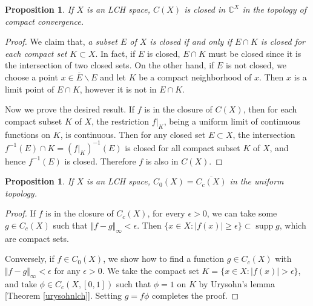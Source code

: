 \documentclass{article}
\numberwithin{equation}{section}
\newcommand{\bbC}{\mathbb{C}}
\newcommand{\ol}{\overline}
\DeclareMathOperator{\supp}{supp}
\theoremstyle{plain}
\newtheorem{proposition}[theorem]{Proposition}
\theoremstyle{definition}
\begin{document}
\begin{proposition}
	If $X$ is an LCH space, $C(X)$ is closed in $\bbC^X$ in the topology of compact convergence. 
\end{proposition}
\begin{proof}
	We claim that, \textit{a subset $E$ of $X$ is closed if and only if $E\cap K$ is closed for each compact set $K\subset X$}. In fact, if $E$ is closed, $E\cap K$ must be closed since it is the intersection of two closed sets. On the other hand, if $E$ is not closed, we choose a point $x\in\ol{E}\backslash E$ and let $K$ be a compact neighborhood of $x$. Then $x$ is a limit point of $E\cap K$, however it is not in $E\cap K$.
	
	Now we prove the desired result. If $f$ is in the closure of $C(X)$, then for each compact subset $K$ of $X$, the restriction $f|_K$, being a uniform limit of continuous functions on $K$, is continuous. Then for any closed set $E\subset X$, the intersection $f^{-1}(E)\cap K=(f|_K)^{-1}(E)$ is closed for all compact subset $K$ of $X$, and hence $f^{-1}(E)$ is closed. Therefore $f$ is also in $C(X)$.
\end{proof}

\begin{proposition}\label{c0closecc}
	If $X$ is an LCH space, $C_0(X)=\ol{C_c(X)}$ in the uniform topology.
\end{proposition}
\begin{proof}
	If $f$ is in the closure of $C_c(X)$, for every $\epsilon>0$, we can take some $g\in C_c(X)$ such that $\Vert f-g\Vert_\infty<\epsilon$. Then $\{x\in X:\vert f(x)\vert\geq\epsilon\}\subset\supp g$, which are compact sets. 
	
	Conversely, if $f\in C_0(X)$, we show how to find a function $g\in C_c(X)$ with $\Vert f-g\Vert_\infty<\epsilon$ for any $\epsilon>0$. We take the compact set $K=\{x\in X:\vert f(x)\vert>\epsilon\}$, and take $\phi\in C_c(X,[0,1])$ such that $\phi=1$ on $K$ by Urysohn's lemma [Theorem \ref{urysohnlch}]. Setting $g=f\phi$ completes the proof.
\end{proof}
\end{document}
